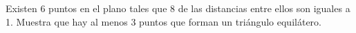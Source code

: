 Existen 6 puntos en el plano tales que 8 de las distancias entre ellos son iguales a 1. Muestra que hay al menos 3 puntos que forman un triángulo equilátero. 